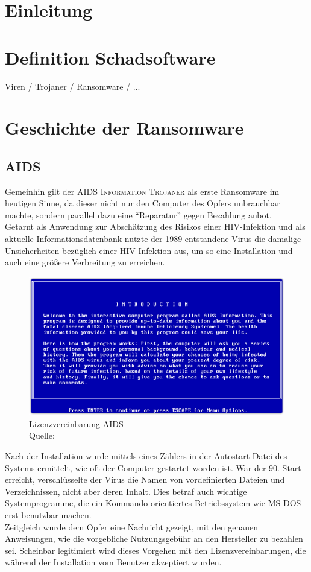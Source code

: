 \section{Einleitung}
\label{sec:einleitung}

\section{Definition Schadsoftware}
\label{sec:definition}
Viren / Trojaner / Ransomware / ...

\section{Geschichte der Ransomware}
\label{sec:geschichte}
	\subsection{AIDS}
		Gemeinhin gilt der \textsc{AIDS Information Trojaner} als erste Ransomware im heutigen Sinne, da dieser nicht nur den Computer des Opfers unbrauchbar machte, sondern
		parallel dazu eine "`Reparatur"' gegen Bezahlung anbot. \\
		Getarnt als Anwendung zur Abschätzung des Risikos einer HIV-Infektion und als aktuelle Informationsdatenbank nutzte der 1989 entstandene Virus die damalige
		Unsicherheiten bezüglich einer HIV-Infektion aus, um so eine Installation und auch eine größere Verbreitung zu erreichen. 
	\begin{figure}[h!]
		\centering
		\includegraphics[width=\linewidth]{img/aids1.png}
		\caption{Lizenzvereinbarung AIDS \\ Quelle: \cite{aids:sophos}}
		\label{fig:lizenz_aids}
	\end{figure}

		Nach der Installation wurde mittels eines Zählers in der Autostart-Datei des Systems ermittelt, wie oft der Computer gestartet worden ist. War der 90. Start 
		erreicht, verschlüsselte der Virus die Namen von vordefinierten Dateien und Verzeichnissen, nicht aber deren Inhalt. Dies betraf auch wichtige Systemprogramme, die 
		ein Kommando-orientiertes Betriebssystem wie MS-DOS erst benutzbar machen. \\
		Zeitgleich wurde dem Opfer eine Nachricht gezeigt, mit den genauen Anweisungen, wie die vorgebliche Nutzungsgebühr an den Hersteller zu bezahlen sei. 
		Scheinbar legitimiert wird dieses Vorgehen mit den Lizenzvereinbarungen, die während der Installation vom Benutzer akzeptiert wurden. 

